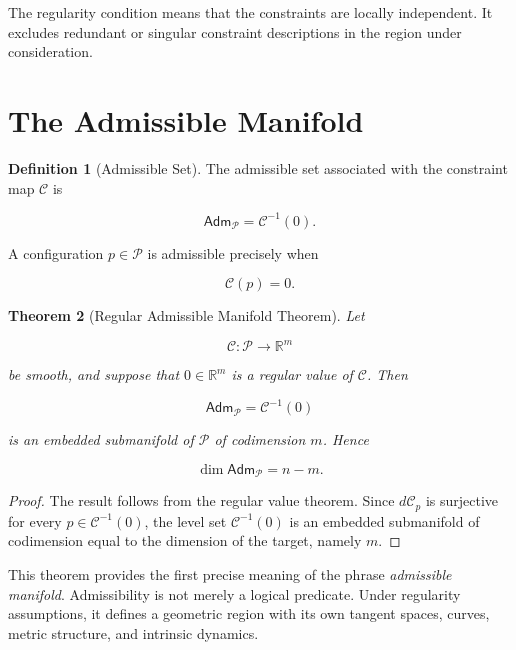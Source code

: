 \documentclass[11pt,oneside]{book}
\numberwithin{equation}{chapter}
\theoremstyle{definition}
\newtheorem{definition}{Definition}[chapter]
\theoremstyle{plain}
\newtheorem{theorem}[definition]{Theorem}
\newcommand{\Adm}{\mathsf{Adm}}
\begin{document}
The regularity condition means that the constraints are locally independent.
It excludes redundant or singular constraint descriptions in the region
under consideration.

\section{The Admissible Manifold}

\begin{definition}[Admissible Set]

The admissible set associated with the constraint map \(\mathcal C\) is

\[
\Adm_{\mathcal P}
=
\mathcal C^{-1}(0).
\]

A configuration \(p\in\mathcal P\) is admissible precisely when

\[
\mathcal C(p)=0.
\]

\end{definition}

\begin{theorem}[Regular Admissible Manifold Theorem]

Let

\[
\mathcal C:\mathcal P\longrightarrow\mathbb R^m
\]

be smooth, and suppose that \(0\in\mathbb R^m\) is a regular value of
\(\mathcal C\). Then

\[
\Adm_{\mathcal P}
=
\mathcal C^{-1}(0)
\]

is an embedded submanifold of \(\mathcal P\) of codimension \(m\). Hence

\[
\dim\Adm_{\mathcal P}
=
n-m.
\]

\end{theorem}

\begin{proof}

The result follows from the regular value theorem. Since
\(d\mathcal C_p\) is surjective for every
\(p\in\mathcal C^{-1}(0)\), the level set \(\mathcal C^{-1}(0)\) is an
embedded submanifold of codimension equal to the dimension of the target,
namely \(m\).

\end{proof}

This theorem provides the first precise meaning of the phrase
\emph{admissible manifold}. Admissibility is not merely a logical predicate.
Under regularity assumptions, it defines a geometric region with its own
tangent spaces, curves, metric structure, and intrinsic dynamics.
\end{document}
